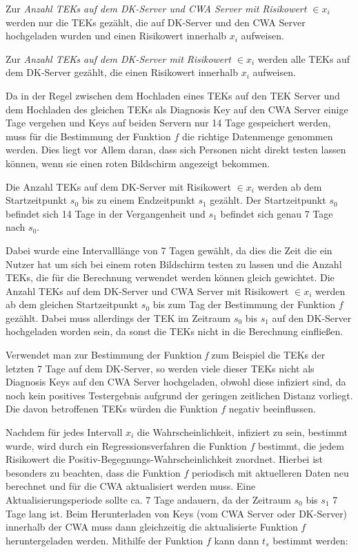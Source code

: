 \documentclass[conference,compsoc]{IEEEtran}
\begin{document}
Zur \textit{Anzahl TEKs auf dem DK-Server und CWA Server mit Risikowert $\in x_i$} werden nur die TEKs gezählt, 
die auf DK-Server und den CWA Server hochgeladen wurden und einen Risikowert innerhalb $x_i$ aufweisen. 

Zur \textit{Anzahl TEKs auf dem DK-Server mit Risikowert $\in x_i$} werden alle TEKs auf dem DK-Server gezählt, die einen Risikowert innerhalb $x_i$ aufweisen.

Da in der Regel zwischen dem Hochladen eines TEKs auf den TEK Server und dem Hochladen des gleichen TEKs als Diagnosis Key auf den CWA Server einige Tage vergehen und 
Keys auf beiden Servern nur 14 Tage gespeichert werden, muss für die Bestimmung der Funktion $f$ die richtige Datenmenge genommen werden.
Dies liegt vor Allem daran, dass sich Personen nicht direkt testen lassen können, wenn sie einen roten Bildschirm angezeigt bekommen.

Die Anzahl TEKs auf dem DK-Server mit Risikowert $\in x_i$ werden ab dem Startzeitpunkt $s_0$ bis zu einem Endzeitpunkt $s_1$ gezählt.
Der Startzeitpunkt $s_0$ befindet sich 14 Tage in der Vergangenheit und $s_1$ befindet sich genau 7 Tage nach $s_0$.

Dabei wurde eine Intervalllänge von 7 Tagen gewählt, da dies die Zeit die ein Nutzer hat um sich bei einem roten Bildschirm testen zu lassen und die Anzahl TEKs, 
die für die Berechnung verwendet werden können gleich gewichtet.
Die Anzahl TEKs auf dem DK-Server und CWA Server mit Risikowert $\in x_i$ werden ab dem gleichen Startzeitpunkt $s_0$ bis zum Tag der Bestimmung der Funktion $f$ gezählt.
Dabei muss allerdings der TEK im Zeitraum $s_0$ bis $s_1$ auf den DK-Server hochgeladen worden sein, da sonst die TEKs nicht in die Berechnung einfließen. 

Verwendet man zur Bestimmung der Funktion \textit{f} zum Beispiel die TEKs der letzten 7 Tage auf dem DK-Server, 
so werden viele dieser TEKs nicht als Diagnosis Keys auf den CWA Server hochgeladen, 
obwohl diese infiziert sind, da noch kein positives Testergebnis aufgrund der geringen zeitlichen Distanz vorliegt. 
Die davon betroffenen TEKs würden die Funktion $f$ negativ beeinflussen.

Nachdem für jedes Intervall $x_i$ die Wahrscheinlichkeit, infiziert zu sein, bestimmt wurde, wird durch ein Regressionsverfahren die Funktion $f$ bestimmt, 
die jedem Risikowert die Positiv-Begegnungs-Wahrscheinlichkeit zuordnet. 
Hierbei ist besonders zu beachten, dass die Funktion $f$ periodisch mit aktuelleren Daten neu berechnet und für die CWA aktualisiert werden muss. 
Eine Aktualisierungsperiode sollte ca. 7 Tage andauern, da der Zeitraum $s_0$ bis $s_1$ 7 Tage lang ist.
Beim Herunterladen von Keys (vom CWA Server oder DK-Server) innerhalb der CWA muss dann gleichzeitig die aktualisierte Funktion $f$ heruntergeladen werden. 
Mithilfe der Funktion $f$ kann dann $t_s$ bestimmt werden: 
\end{document}
